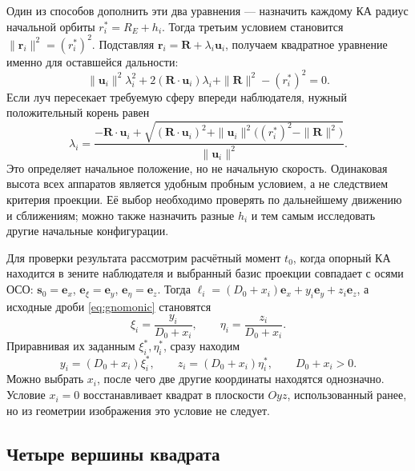 \documentclass[a4paper,12pt]{article}
\begin{document}
Один из способов дополнить эти два уравнения --- назначить каждому КА радиус начальной орбиты $r_i^*=R_E+h_i$. Тогда третьим условием становится $\|\mathbf r_i\|^2=(r_i^*)^2$. Подставляя $\mathbf r_i=\mathbf R+\lambda_i\mathbf u_i$, получаем квадратное уравнение именно для оставшейся дальности:
\begin{equation}
    \|\mathbf u_i\|^2\lambda_i^2
       +2(\mathbf R\cdot\mathbf u_i)\lambda_i
       +\|\mathbf R\|^2-(r_i^*)^2=0.
    \label{eq:altitude_quadratic}
\end{equation}
Если луч пересекает требуемую сферу впереди наблюдателя, нужный положительный корень равен
\begin{equation}
    \lambda_i=
    \frac{-\mathbf R\cdot\mathbf u_i+
      \sqrt{(\mathbf R\cdot\mathbf u_i)^2+
       \|\mathbf u_i\|^2\bigl((r_i^*)^2-\|\mathbf R\|^2\bigr)}}
       {\|\mathbf u_i\|^2}.
    \label{eq:altitude_range}
\end{equation}
Это определяет начальное положение, но не начальную скорость. Одинаковая высота всех аппаратов является удобным пробным условием, а не следствием критерия проекции. Её выбор необходимо проверять по дальнейшему движению и сближениям; можно также назначить разные $h_i$ и тем самым исследовать другие начальные конфигурации.

Для проверки результата рассмотрим расчётный момент $t_0$, когда опорный КА находится в зените наблюдателя и выбранный базис проекции совпадает с осями ОСО: $\mathbf s_0=\mathbf e_x$, $\mathbf e_\xi=\mathbf e_y$, $\mathbf e_\eta=\mathbf e_z$. Тогда $\boldsymbol\ell_i=(D_0+x_i)\mathbf e_x+y_i\mathbf e_y+z_i\mathbf e_z$, а исходные дроби \eqref{eq:gnomonic} становятся
\begin{equation}
    \xi_i=\frac{y_i}{D_0+x_i},
    \qquad
    \eta_i=\frac{z_i}{D_0+x_i}.
    \label{eq:zenith_projection}
\end{equation}
Приравнивая их заданным $\xi_i^*,\eta_i^*$, сразу находим
\begin{equation}
    y_i=(D_0+x_i)\xi_i^*,
    \qquad
    z_i=(D_0+x_i)\eta_i^*,
    \qquad D_0+x_i>0.
    \label{eq:zenith_inverse}
\end{equation}
Можно выбрать $x_i$, после чего две другие координаты находятся однозначно. Условие $x_i=0$ восстанавливает квадрат в плоскости $Oyz$, использованный ранее, но из геометрии изображения это условие не следует.

\subsection{Четыре вершины квадрата}
\end{document}
